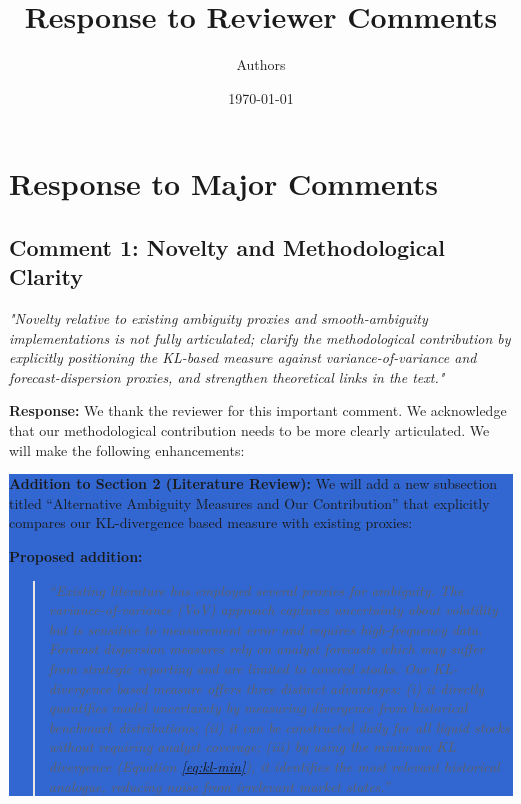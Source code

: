 \documentclass[12pt]{article}
\title{Response to Reviewer Comments}
\author{Authors}
\date{\today}
\begin{document}
\maketitle

\section*{Response to Major Comments}

\subsection*{Comment 1: Novelty and Methodological Clarity}
\textit{"Novelty relative to existing ambiguity proxies and smooth-ambiguity implementations is not fully articulated; clarify the methodological contribution by explicitly positioning the KL-based measure against variance-of-variance and forecast-dispersion proxies, and strengthen theoretical links in the text."}

\textbf{Response:} We thank the reviewer for this important comment. We acknowledge that our methodological contribution needs to be more clearly articulated. We will make the following enhancements:

\colorbox{highlight}{\parbox{\dimexpr\linewidth-2\fboxsep}{%
\textbf{Addition to Section 2 (Literature Review):} We will add a new subsection titled ``Alternative Ambiguity Measures and Our Contribution'' that explicitly compares our KL-divergence based measure with existing proxies:

\vspace{0.3cm}
\noindent \textbf{Proposed addition:}
\begin{quote}
\textit{``Existing literature has employed several proxies for ambiguity. The variance-of-variance (VoV) approach \citep{Brenner2018} captures uncertainty about volatility but is sensitive to measurement error and requires high-frequency data. Forecast dispersion measures \citep{Anderson2018} rely on analyst forecasts which may suffer from strategic reporting and are limited to covered stocks. Our KL-divergence based measure offers three distinct advantages: (i) it directly quantifies model uncertainty by measuring divergence from historical benchmark distributions; (ii) it can be constructed daily for all liquid stocks without requiring analyst coverage; (iii) by using the minimum KL divergence (Equation \ref{eq:kl-min}), it identifies the most relevant historical analogue, reducing noise from irrelevant market states.''}
\end{quote}
}}
\end{document}

